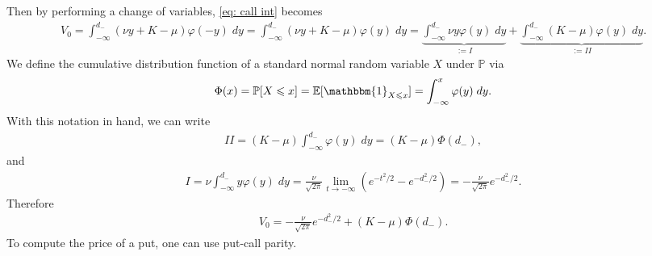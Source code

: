 \documentclass[reqno]{amsart}
\begin{document}
Then by performing a change of variables, \eqref{eq: call int} becomes 
\begin{align}
	 V_0 = \int_{-\infty}^{d_-} (\nu y + K - \mu) \varphi(-y) \; dy = \int_{-\infty}^{d_-} (\nu y + K - \mu) \varphi(y) \; dy = \underbrace{\int_{-\infty}^{d_-} \nu y \varphi(y) \; dy}_{:= I} + \underbrace{\int_{-\infty}^{d_-}  (K-\mu)\varphi(y) \; dy}_{:= II}.
\end{align}
We define the cumulative distribution function of a standard normal random variable $X$ under $\mathbb{P}$ via 
\begin{align}
	 \Phi(x) = \mathbb{P}[X \le x] = \E[ \mathbbm{1}_{X \le x}] = \int_{-\infty}^x \varphi(y) \; dy.
\end{align}
With this notation in hand, we can write 
\begin{align}
	 II = (K-\mu) \int_{-\infty}^{d_-} \varphi(y) \; dy = (K-\mu) \Phi(d_-),
\end{align}
and 
\begin{align}
	 I = \nu \int_{-\infty}^{d_-} y \varphi(y) \; dy =  \frac{\nu}{\sqrt{2\pi}} \lim_{t \to -\infty} (e^{-t^2/2} - e^{-d_-^2/2}) = -\frac{\nu}{\sqrt{2\pi}} e^{-d_-^2/2}.
\end{align}
Therefore 
\begin{align}
	 V_0 =  -\frac{\nu}{\sqrt{2\pi}} e^{-d_-^2/2} + (K-\mu) \Phi(d_-).
\end{align}
To compute the price of a put, one can use put-call parity. 
\end{document}
